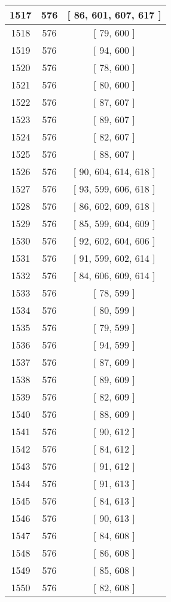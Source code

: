 \begin{center}
\begin{longtable}[H]{|| c c c ||}
\hline
1517 & 576 & [ 86, 601, 607, 617 ] \\ 
\hline
1518 & 576 & [ 79, 600 ] \\ 
\hline
1519 & 576 & [ 94, 600 ] \\ 
\hline
1520 & 576 & [ 78, 600 ] \\ 
\hline
1521 & 576 & [ 80, 600 ] \\ 
\hline
1522 & 576 & [ 87, 607 ] \\ 
\hline
1523 & 576 & [ 89, 607 ] \\ 
\hline
1524 & 576 & [ 82, 607 ] \\ 
\hline
1525 & 576 & [ 88, 607 ] \\ 
\hline
1526 & 576 & [ 90, 604, 614, 618 ] \\ 
\hline
1527 & 576 & [ 93, 599, 606, 618 ] \\ 
\hline
1528 & 576 & [ 86, 602, 609, 618 ] \\ 
\hline
1529 & 576 & [ 85, 599, 604, 609 ] \\ 
\hline
1530 & 576 & [ 92, 602, 604, 606 ] \\ 
\hline
1531 & 576 & [ 91, 599, 602, 614 ] \\ 
\hline
1532 & 576 & [ 84, 606, 609, 614 ] \\ 
\hline
1533 & 576 & [ 78, 599 ] \\ 
\hline
1534 & 576 & [ 80, 599 ] \\ 
\hline
1535 & 576 & [ 79, 599 ] \\ 
\hline
1536 & 576 & [ 94, 599 ] \\ 
\hline
1537 & 576 & [ 87, 609 ] \\ 
\hline
1538 & 576 & [ 89, 609 ] \\ 
\hline
1539 & 576 & [ 82, 609 ] \\ 
\hline
1540 & 576 & [ 88, 609 ] \\ 
\hline
1541 & 576 & [ 90, 612 ] \\ 
\hline
1542 & 576 & [ 84, 612 ] \\ 
\hline
1543 & 576 & [ 91, 612 ] \\ 
\hline
1544 & 576 & [ 91, 613 ] \\ 
\hline
1545 & 576 & [ 84, 613 ] \\ 
\hline
1546 & 576 & [ 90, 613 ] \\ 
\hline
1547 & 576 & [ 84, 608 ] \\ 
\hline
1548 & 576 & [ 86, 608 ] \\ 
\hline
1549 & 576 & [ 85, 608 ] \\ 
\hline
1550 & 576 & [ 82, 608 ] \\ 

\end{longtable}
\end{center}
